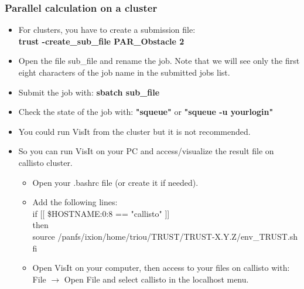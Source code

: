 \documentclass[10pt, hyperref={unicode=true,pdfusetitle, bookmarks=true,bookmarksnumbered=false,bookmarksopen=false, breaklinks=false,pdfborder={0 0 1},backref=true,colorlinks=true,linkcolor=darkblue,pageanchor}]{beamer}
\begin{document}
\begin{frame}
\frametitle{Parallel calculation on a cluster}
\begin{block}{}

\begin{itemize}
\item For clusters, you have to create a submission file:\\
\textbf{trust -create\_sub\_file PAR\_Obstacle 2}

\item Open the file sub\_file and rename the job. Note that we will see only the first eight characters of the job name in the submitted jobs list.

\item Submit the job with: 
\textbf{sbatch sub\_file}

\item Check the state of the job with: \textbf{"squeue"} or \textbf{"squeue -u yourlogin"}

\item You could run VisIt from the cluster but it is not recommended.

\item So you can run VisIt on your PC and access/visualize the result file on callisto cluster.
        \begin{itemize}
        \item Open your .bashrc file (or create it if needed).
        \item Add the following lines:\\
        if [[ \${HOSTNAME:0:8} == "callisto" ]] \\
        then\\
           source /panfs/ixion/home/triou/TRUST/TRUST-X.Y.Z/env\_TRUST.sh \\
        fi
        \item Open VisIt on your computer, then access to your files on callisto with:\\
        File $\rightarrow$ Open File and select callisto in the localhost menu.
        \end{itemize}

\end{itemize}

\end{block}
\end{frame}
\end{document}
